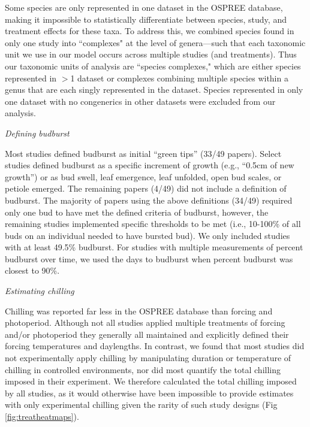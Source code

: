 \documentclass{article}
\begin{document}
\par Some species are only represented in one dataset in the OSPREE database, making it impossible to statistically differentiate between species, study, and treatment effects for these taxa. To address this, we combined species found in only one study into ``complexes" at the level of genera---such that each taxonomic unit we use in our model occurs across multiple studies (and treatments). Thus our taxonomic units of analysis are ``species complexes," which are either species represented in $>$1 dataset or complexes combining multiple species within a genus that are each singly represented in the dataset. Species represented in only one dataset with no congenerics in other datasets were excluded from our analysis.

\par \emph{Defining budburst}

Most studies defined budburst as initial ``green tips'' (33/49 papers). Select studies defined budburst as a specific increment of growth (e.g., ``0.5cm of new growth'') or as bud swell, leaf emergence, leaf unfolded, open bud scales, or petiole emerged. The remaining papers (4/49) did not include a definition of budburst. The majority of papers using the above definitions (34/49) required only one bud to have met the defined criteria of budburst, however, the remaining studies implemented specific thresholds to be met (i.e., 10-100\% of all buds on an individual needed to have bursted bud). We only included studies with at least 49.5\% budburst. For studies with multiple measurements of percent budburst over time, we used the days to budburst when percent budburst was closest to 90\%.

\par{\emph{Estimating chilling}}

Chilling was reported far less in the OSPREE database than forcing and photoperiod. Although not all studies applied multiple treatments of forcing and/or photoperiod they generally all maintained and explicitly defined their forcing temperatures and daylengths. In contrast, we found that most studies did not experimentally apply chilling by manipulating duration or temperature of chilling in controlled environments, nor did most quantify the total chilling imposed in their experiment. We therefore calculated the total chilling imposed by all studies, as it would otherwise have been impossible to provide estimates with only experimental chilling given the rarity of such study designs (Fig \ref{fig:treatheatmaps}). 
\end{document}
